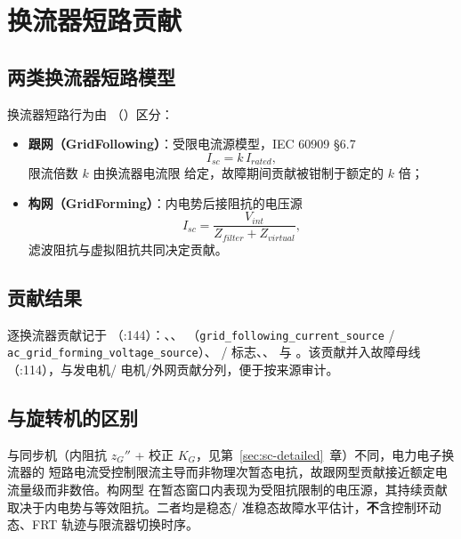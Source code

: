 \section{换流器短路贡献}\label{sec:sc-converter}

\subsection{两类换流器短路模型}
换流器短路行为由 （）区分：
\begin{itemize}
  \item \textbf{跟网（GridFollowing）}：受限电流源模型，IEC 60909 §6.7
        \begin{equation}
        I_{sc}=k\,I_{rated},
        \end{equation}
        限流倍数 $k$ 由换流器电流限  给定，故障期间贡献被钳制于额定的 $k$ 倍；
  \item \textbf{构网（GridForming）}：内电势后接阻抗的电压源
        \begin{equation}
        I_{sc}=\frac{V_{int}}{Z_{filter}+Z_{virtual}},
        \end{equation}
        滤波阻抗与虚拟阻抗共同决定贡献。
\end{itemize}

\subsection{贡献结果}
逐换流器贡献记于 （:144）：、、
（\texttt{grid\_following\_current\_source} / \texttt{ac\_grid\_forming\_voltage\_source}）、
/ 标志、、 与
。该贡献并入故障母线 （:114），与发电机/
电机/外网贡献分列，便于按来源审计。

\subsection{与旋转机的区别}
与同步机（内阻抗 $z_G''$ + 校正 $K_G$，见第~\ref{sec:sc-detailed}~章）不同，电力电子换流器的
短路电流受控制限流主导而非物理次暂态电抗，故跟网型贡献接近额定电流量级而非数倍。构网型
在暂态窗口内表现为受阻抗限制的电压源，其持续贡献取决于内电势与等效阻抗。二者均是稳态/
准稳态故障水平估计，\textbf{不}含控制环动态、FRT 轨迹与限流器切换时序。
